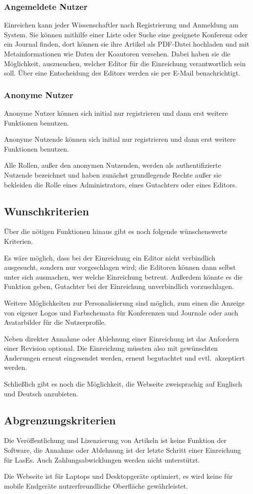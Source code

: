 \subsubsection{Angemeldete Nutzer}
Einreichen kann jeder Wissenschaftler nach Registrierung und Anmeldung am System.
Sie können mithilfe einer Liste oder Suche eine geeignete Konferenz oder ein Journal finden,
dort können sie ihre Artikel als PDF-Datei hochladen und mit Metainformationen wie Daten der Koautoren versehen.
Dabei haben sie die Möglichkeit, auszusuchen, welcher Editor für die Einreichung verantwortlich sein soll.
Über eine Entscheidung des Editors werden sie per E-Mail benachrichtigt.

\subsubsection{Anonyme Nutzer}
Anonyme Nutzer können sich initial nur registrieren und dann erst weitere Funktionen benutzen.

Anonyme Nutzende können sich initial nur registrieren und dann erst weitere Funktionen benutzen.

Alle Rollen, außer den anonymen Nutzenden, werden als authentifizierte Nutzende bezeichnet und haben zunächst grundlegende Rechte außer sie bekleiden die Rolle eines Administrators, eines Gutachters oder eines Editors.

\subsection{Wunschkriterien}

Über die nötigen Funktionen hinaus gibt es noch folgende wünschenswerte Kriterien.

Es wäre möglich, dass bei der Einreichung ein Editor nicht verbindlich ausgesucht, sondern nur vorgeschlagen wird;
die Editoren können dann selbst unter sich ausmachen, wer welche Einreichung betreut.
Außerdem könnte es die Funktion geben, Gutachter bei der Einreichung unverbindlich vorzuschlagen.

Weitere Möglichkeiten zur Personalisierung sind möglich,
zum einen die Anzeige von eigener Logos und Farbschemata für Konferenzen und Journale oder auch Avatarbilder für die Nutzerprofile.

Neben direkter Annahme oder Ablehnung einer Einreichung ist das Anfordern einer Revision optional.
Die Einreichung müssten also mit gewünschten Änderungen erneut eingesendet werden, erneut begutachtet und evtl.\ akzeptiert werden.

Schließlich gibt es noch die Möglichkeit, die Webseite zweisprachig auf Englisch und Deutsch anzubieten.

\subsection{Abgrenzungskriterien}

Die Veröffentlichung und Lizenzierung von Artikeln ist keine Funktion der Software,
die Annahme oder Ablehnung ist der letzte Schritt einer Einreichung für LasEs.
Auch Zahlungsabwicklungen werden nicht unterstützt.

Die Webseite ist für Laptops und Desktopgeräte optimiert, es wird keine für mobile Endgeräte nutzerfreundliche Oberfläche gewährleistet.